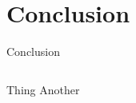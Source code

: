 \section{Conclusion}

\begin{frame}{Conclusion}
\begin{columns}
\centering
\begin{outline}
  \1 Thing
  \2 Another
\end{outline}

\begin{center}
\centering

\end{center}
\end{columns}
\end{frame}
